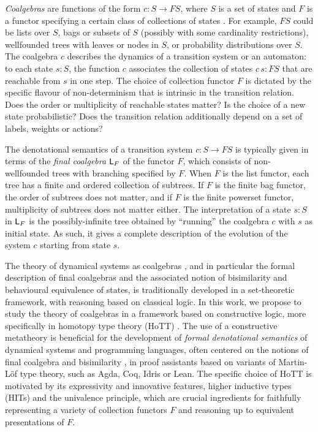 \documentclass[runningheads]{llncs}
\begin{document}
\emph{Coalgebras} are functions of the form $c : S \to F S$, where $S$ is a set of states and $F$ is a functor specifying a certain class of collections of states \cite{Rutten2000,Jacobs2016}. For example, $F S$ could be lists over $S$, bags or subsets of $S$ (possibly with some cardinality restrictions), wellfounded trees with leaves or nodes in $S$, or probability distributions over $S$. The coalgebra $c$ describes the dynamics of a transition system or an automaton: to each state $s : S$, the function $c$ associates the collection of states $c \,s : F S$ that are reachable from $s$ in one step. The choice of collection functor $F$ is dictated by the specific flavour of non-determinism that is intrinsic in the transition relation. Does the order or multiplicity of reachable states matter? Is the choice of a new state probabilistic? Does the transition relation additionally depend on a set of labels, weights or actions?

The denotational semantics of a transition system $c : S \to F S$ is typically given in terms of the \emph{final coalgebra} $\mathsf{L}_{F}$ of the functor $F$, which  consists of non-wellfounded trees with branching specified by $F$. When $F$ is the list functor, each tree has a finite and ordered collection of subtrees. If $F$ is the finite bag functor, the order of subtrees does not matter, and if $F$ is the finite powerset functor, multiplicity of subtrees does not matter either. %
The interpretation of a state $s : S$ in $\mathsf{L}_{F}$ is the possibly-infinite tree obtained by ``running'' the coalgebra $c$ with $s$ as initial state. As such, it gives a complete description of the evolution of the system $c$ starting from state $s$.

The theory of dynamical systems as coalgebras \cite{Rutten2000,Jacobs2016}, and in particular the formal description of final coalgebras \cite{Barr1993,Adamek1995,Worrell2005} and the associated notion of bisimilarity and behavioural equivalence of states, is traditionally developed in a set-theoretic framework, with reasoning based on classical logic. In this work, we propose to study the theory of coalgebras in a framework based on constructive logic, more specifically in homotopy type theory (HoTT) \cite{HoTTBook}. The use of a constructive metatheory is beneficial for the development of \emph{formal denotational semantics} of dynamical systems and programming languages, often centered on the notions of final coalgebra and bisimilarity \cite{Turi1997}, in proof assistants based on variants of Martin-L{\"o}f type theory, such as Agda, Coq, Idris or Lean. The specific choice of HoTT is motivated by its expressivity and innovative features, higher inductive types (HITs) and the univalence principle, which are crucial ingredients for faithfully representing a variety of collection functors $F$ and reasoning up to equivalent presentations of $F$. 
\end{document}
